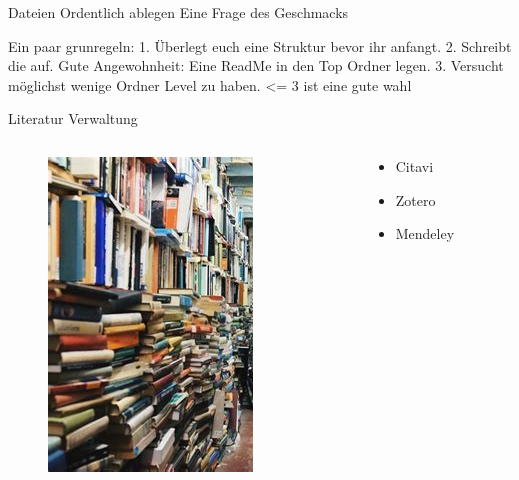 \documentclass[aspectratio=169,shownotes]{beamer}
\begin{document}
\begin{frame}{Dateien Ordentlich ablegen}
    Eine Frage des Geschmacks

    Ein paar grunregeln:
    1. Überlegt euch eine Struktur bevor ihr anfangt.
    2. Schreibt die auf. Gute Angewohnheit: Eine ReadMe in den Top Ordner legen.
    3. Versucht möglichst wenige Ordner Level zu haben. <= 3 ist eine gute wahl
    

\end{frame}


\begin{frame}{Literatur Verwaltung}
    \begin{columns}[t]
        \begin{column}{0.29\textwidth}
            \vspace*{-0.1\textheight}
            \begin{figure}[t]
                \includegraphics[height=0.8\textheight]{graphics/LiteraturChaos.jpeg}         
            \end{figure}
        \end{column}        
        \begin{column}{0.69\textwidth}
            \begin{itemize}
                \item Citavi
                \item Zotero
                \item Mendeley
            \end{itemize}           
        \end{column}        
    \end{columns}    
\end{frame}
\end{document}
